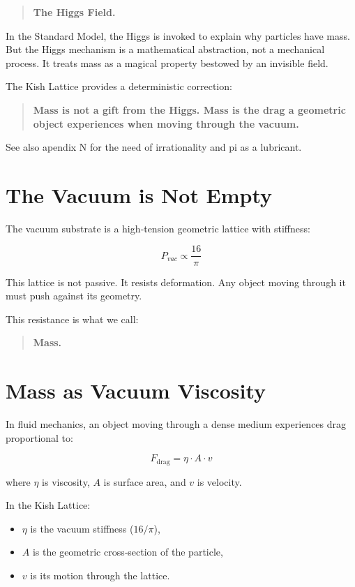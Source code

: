 \documentclass[11pt, letterpaper, openany]{book}
\begin{document}
\begin{quote}
\textbf{The Higgs Field.}
\end{quote}

In the Standard Model, the Higgs is invoked to explain why particles have mass.  
But the Higgs mechanism is a mathematical abstraction, not a mechanical process.  
It treats mass as a magical property bestowed by an invisible field.

The Kish Lattice provides a deterministic correction:

\begin{quote}
\textbf{Mass is not a gift from the Higgs.  
Mass is the drag a geometric object experiences when moving through the vacuum.}
\end{quote}
See also apendix N for the need of irrationality and pi as a lubricant. 
\section{The Vacuum is Not Empty}

The vacuum substrate is a high‑tension geometric lattice with stiffness:



\[
P_{vac} \propto \frac{16}{\pi}
\]



This lattice is not passive.  
It resists deformation.  
Any object moving through it must push against its geometry.

This resistance is what we call:

\begin{quote}
\textbf{Mass.}
\end{quote}

\section{Mass as Vacuum Viscosity}

In fluid mechanics, an object moving through a dense medium experiences drag proportional to:



\[
F_{\text{drag}} = \eta \cdot A \cdot v
\]



where $\eta$ is viscosity, $A$ is surface area, and $v$ is velocity.

In the Kish Lattice:

\begin{itemize}
    \item $\eta$ is the vacuum stiffness ($16/\pi$),
    \item $A$ is the geometric cross‑section of the particle,
    \item $v$ is its motion through the lattice.
\end{itemize}
\end{document}
